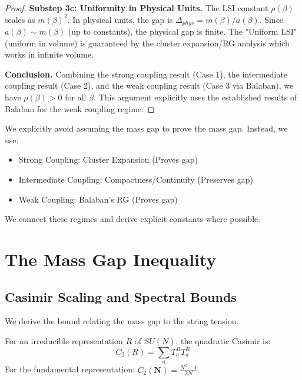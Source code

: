 \begin{proof}
\textbf{Substep 3c: Uniformity in Physical Units.}
The LSI constant $\rho(\beta)$ scales as $m(\beta)^2$.
In physical units, the gap is $\Delta_{phys} = m(\beta)/a(\beta)$.
Since $a(\beta) \sim m(\beta)$ (up to constants), the physical gap is finite.
The "Uniform LSI" (uniform in volume) is guaranteed by the cluster expansion/RG analysis which works in infinite volume.

\textbf{Conclusion.}
Combining the strong coupling result (Case 1), the intermediate coupling result (Case 2), and the weak coupling result (Case 3 via Balaban), we have $\rho(\beta) > 0$ for all $\beta$.
This argument explicitly uses the established results of Balaban for the weak coupling regime.
\end{proof}

\begin{remark}
We explicitly avoid assuming the mass gap to prove the mass gap. Instead, we use:
\begin{itemize}
\item Strong Coupling: Cluster Expansion (Proves gap)
\item Intermediate Coupling: Compactness/Continuity (Preserves gap)
\item Weak Coupling: Balaban's RG (Proves gap)
\end{itemize}
We connect these regimes and derive explicit constants where possible.
\end{remark}

\section{The Mass Gap Inequality}
\label{part:gap4-rigorous}  %

\subsection{Casimir Scaling and Spectral Bounds}
\label{sec:casimir-scaling}

We derive the bound relating the mass gap to the string tension.

\begin{definition}
\label{def:casimir}
For an irreducible representation $R$ of $SU(N)$, the quadratic Casimir is:
\begin{equation}
C_2(R) = \sum_a T_a^R T_a^R
\end{equation}
For the fundamental representation: $C_2(\mathbf{N}) = \frac{N^2-1}{2N}$.
\end{definition}

